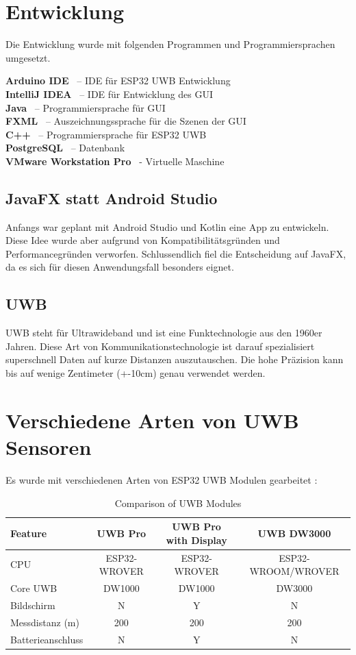 \section{Entwicklung}
Die Entwicklung wurde mit folgenden Programmen und Programmiersprachen umgesetzt.

\textbf{Arduino IDE} \ – IDE für ESP32 UWB Entwicklung \\
\textbf{IntelliJ IDEA} \ – IDE für Entwicklung des GUI \\
\textbf{Java} \ – Programmiersprache für GUI \\
\textbf{FXML} \ – Auszeichnungssprache für die Szenen der GUI \\
\textbf{C++} \ – Programmiersprache für ESP32 UWB \\
\textbf{PostgreSQL} \ – Datenbank \\
\textbf{VMware Workstation Pro} \ - Virtuelle Maschine

\subsection{JavaFX statt Android Studio}
Anfangs war geplant mit Android Studio und Kotlin eine App zu entwickeln. Diese Idee wurde aber aufgrund von Kompatibilitätsgründen und Performancegründen verworfen. Schlussendlich fiel die Entscheidung auf JavaFX, da es sich für diesen Anwendungsfall besonders eignet. 

\subsection{UWB}

UWB steht für Ultrawideband und ist eine Funktechnologie aus den 1960er Jahren. Diese Art von Kommunikationstechnologie ist darauf spezialisiert superschnell Daten auf kurze Distanzen auszutauschen. Die hohe Präzision kann bis auf wenige Zentimeter (+-10cm) genau verwendet werden. \parencite{UWB}

\section{Verschiedene Arten von UWB Sensoren}

Es wurde mit verschiedenen Arten von ESP32 UWB Modulen gearbeitet \parencite{ArtenSensorn}: 

\begin{table}[h]
	\centering
	\small
	\begin{tabular}{|l|c|c|c|}
		\hline
		\textbf{Feature} & \textbf{UWB Pro} & \textbf{UWB Pro with Display} & \textbf{UWB DW3000} \\
		\hline
		CPU & ESP32-WROVER & ESP32-WROVER & ESP32-WROOM/WROVER \\
		\hline
		Core UWB & DW1000 & DW1000 & DW3000 \\
		\hline
		Bildschirm & N & Y & N \\
		\hline
		Messdistanz (m) & 200 & 200 & 200 \\
		\hline
		Batterieanschluss & N & Y & N \\
		\hline
	\end{tabular}
	\caption{Comparison of UWB Modules}
	\label{tab:uwb_comparison}
\end{table}

